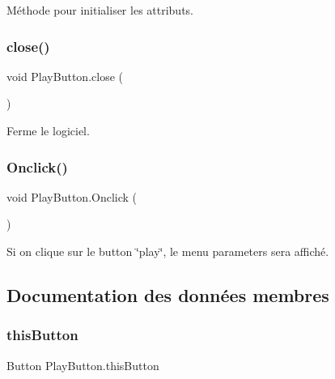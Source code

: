 Méthode pour initialiser les attributs. 

\mbox{\label{class_play_button_a53fd8894bbfa2d9ee15aab0d619e2bf0}} 
\subsubsection{\texorpdfstring{close()}{close()}}
{\footnotesize\ttfamily void Play\+Button.\+close (\begin{DoxyParamCaption}{ }\end{DoxyParamCaption})\hspace{0.3cm}{\ttfamily [inline]}}



Ferme le logiciel. 

\mbox{\label{class_play_button_ae50ebca92c570fc8eb2cdaa79eff1865}} 
\subsubsection{\texorpdfstring{Onclick()}{Onclick()}}
{\footnotesize\ttfamily void Play\+Button.\+Onclick (\begin{DoxyParamCaption}{ }\end{DoxyParamCaption})\hspace{0.3cm}{\ttfamily [inline]}}



Si on clique sur le button \char`\"{}play\char`\"{}, le menu parameters sera affiché. 



\subsection{Documentation des données membres}
\mbox{\label{class_play_button_a2c13864ecb338779b949a59c3294b038}} 
\subsubsection{\texorpdfstring{this\+Button}{thisButton}}
{\footnotesize\ttfamily Button Play\+Button.\+this\+Button\hspace{0.3cm}{\ttfamily [private]}}

